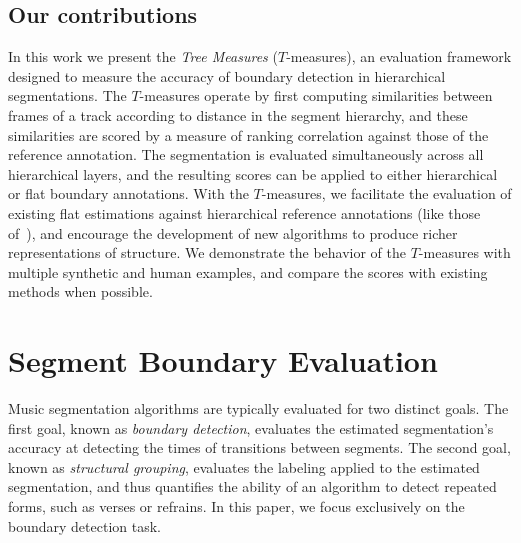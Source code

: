 \documentclass{article}
\begin{document}
\subsection{Our contributions}
In this work we present the \emph{Tree Measures} ($T$-measures), an evaluation framework designed
to measure the accuracy of boundary detection in hierarchical segmentations.
The $T$-measures operate by first computing similarities between frames of a track according to distance in the segment hierarchy, and these similarities are scored by
a measure of ranking correlation against those of the reference annotation.
The segmentation is evaluated simultaneously across all hierarchical layers, and the resulting scores can be applied to either hierarchical or flat boundary annotations.
With the $T$-measures, we facilitate the evaluation of existing flat estimations against hierarchical reference annotations (like those of~\cite{Smith2011}), and encourage the development of new algorithms
to produce richer representations of structure.
We demonstrate the behavior of the $T$-measures with multiple synthetic and human examples, and compare the scores with existing methods when possible.


\section{Segment Boundary Evaluation}\label{sec:curr_meth}

Music segmentation algorithms are typically evaluated for two distinct goals.  
The first goal, known as \emph{boundary detection}, evaluates the estimated segmentation's accuracy at detecting the times of transitions between segments.
The second goal, known as \emph{structural grouping}, evaluates the labeling applied to the estimated segmentation, and thus quantifies the ability of an
algorithm to detect repeated forms, such as verses or refrains. 
In this paper, we focus exclusively on the boundary detection task.
\end{document}
